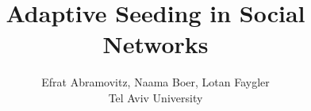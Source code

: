 \documentclass[tikz,dvipsnames]{vldb}
\begin{document}
\title{Adaptive Seeding in Social Networks}
\author{Efrat Abramovitz, Naama Boer, Lotan Faygler \\ Tel Aviv University}



\maketitle







\vspace{-1mm}
% 
% 








{\large

}
%
\end{document}
